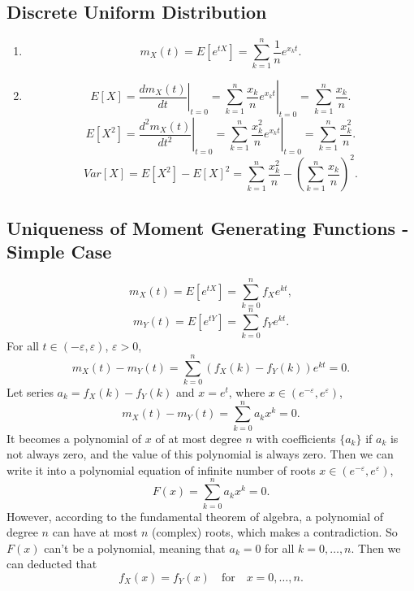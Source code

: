 \documentclass[11pt,a4paper]{article}
\begin{document}
\subsection{Discrete Uniform Distribution}

\begin{enumerate}[label=\roman*)]
\item 
$$m_X(t)=E[e^{tX}]=\sum_{k=1}^n\frac{1}{n}e^{x_kt}.$$
\item
$$E[X]=\left.\frac{dm_X(t)}{dt}\right|_{t=0}=\left.\sum_{k=1}^n\frac{x_k}{n}e^{x_kt}\right|_{t=0}=\sum_{k=1}^n\frac{x_k}{n}.$$
$$E[X^2]=\left.\frac{d^2m_X(t)}{dt^2}\right|_{t=0}=\left.\sum_{k=1}^n\frac{x_k^2}{n}e^{x_kt}\right|_{t=0}=\sum_{k=1}^n\frac{x_k^2}{n}.$$
$$Var[X]=E[X^2]-E[X]^2=\sum_{k=1}^n\frac{x_k^2}{n}-\left(\sum_{k=1}^n\frac{x_k}{n}\right)^2.$$
\end{enumerate}

\subsection{Uniqueness of Moment Generating Functions - Simple Case}
$$m_X(t)=E[e^{tX}]=\sum_{k=0}^nf_Xe^{kt},$$
$$m_Y(t)=E[e^{tY}]=\sum_{k=0}^nf_Ye^{kt}.$$
For all $t\in(-\varepsilon,\varepsilon)$, $\varepsilon>0$,
$$m_X(t)-m_Y(t)=\sum_{k=0}^n(f_X(k)-f_Y(k))e^{kt}=0.$$
Let series $a_k=f_X(k)-f_Y(k)$ and $x=e^t$, where $x\in(e^{-\varepsilon},e^\varepsilon)$,
$$m_X(t)-m_Y(t)=\sum_{k=0}^na_kx^k=0.$$
It becomes a polynomial of $x$ of at most degree $n$ with coefficients $\{a_k\}$ if $a_k$ is not always zero, and the value of this polynomial is always zero. Then we can write it into a polynomial equation of infinite number of roots $x\in(e^{-\varepsilon},e^\varepsilon)$,
$$F(x)=\sum_{k=0}^na_kx^k=0.$$
However, according to the fundamental theorem of algebra, a polynomial of degree $n$ can have at most $n$ (complex) roots, which makes a contradiction. So $F(x)$ can't be a polynomial, meaning that $a_k=0$ for all $k=0,\dots,n$. Then we can deducted that
$$f_X(x)=f_Y(x)\quad\textrm{for}\quad x=0,\dots,n.$$
\end{document}
